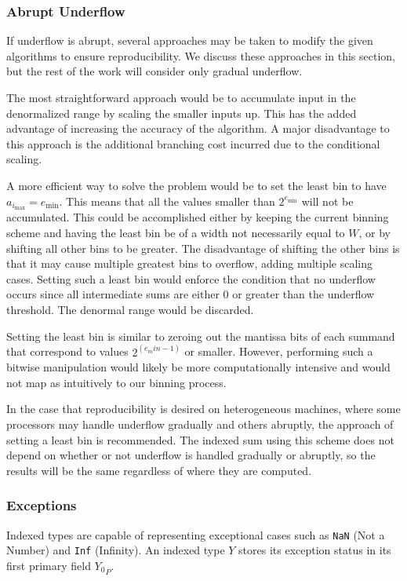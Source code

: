     \subsubsection{Abrupt Underflow}
      \label{sec:indexed_underflow_abrupt}
      If underflow is abrupt, several approaches may be taken to modify the
      given algorithms to ensure reproducibility. We discuss these approaches in this section, but the rest of the work will consider only gradual underflow.

      The most straightforward approach would be to accumulate input in the
      denormalized range by scaling the smaller inputs up. This has the added
      advantage of increasing the accuracy of the algorithm. A major
      disadvantage to this approach is the additional branching cost incurred
      due to the conditional scaling.

      A more efficient way to solve the problem would be to set the least bin
      to have $a_{i_{\max}} = e_{\min}$. This means that all the values smaller
      than $2^{e_{\min}}$ will not be accumulated. 
      This could be accomplished either
      by keeping the current binning scheme and having the least bin be of a
      width not necessarily equal to $W$, or by shifting all other bins to be
      greater. The disadvantage of shifting the other bins is that it may cause
      multiple greatest bins to overflow, adding multiple scaling cases.
      Setting such a least bin would enforce the condition that no underflow
      occurs since all intermediate sums are either $0$ or greater than the
      underflow threshold. The denormal range would be discarded.

      Setting the least bin is similar to zeroing
      out the mantissa bits of each summand
      that correspond to values $2^{(e_min-1)}$ or smaller. However, performing
      such a bitwise manipulation would likely be more computationally intensive
      and would not map as intuitively to our binning process.

      In the case that reproducibility is desired on heterogeneous machines,
      where some processors may handle underflow gradually and others abruptly,
      the approach of setting a least bin is recommended. The indexed sum using
      this scheme does not depend on whether or not underflow is handled
      gradually or abruptly, so the results will be the same regardless of
      where they are computed.

    \subsubsection{Exceptions}
      \label{sec:indexed_exceptions}
      Indexed types are capable of representing exceptional cases such as
      \texttt{NaN} (Not a Number) and \texttt{Inf} (Infinity). An indexed type
      $Y$ stores its exception status in its first primary field ${Y_0}_P$.

